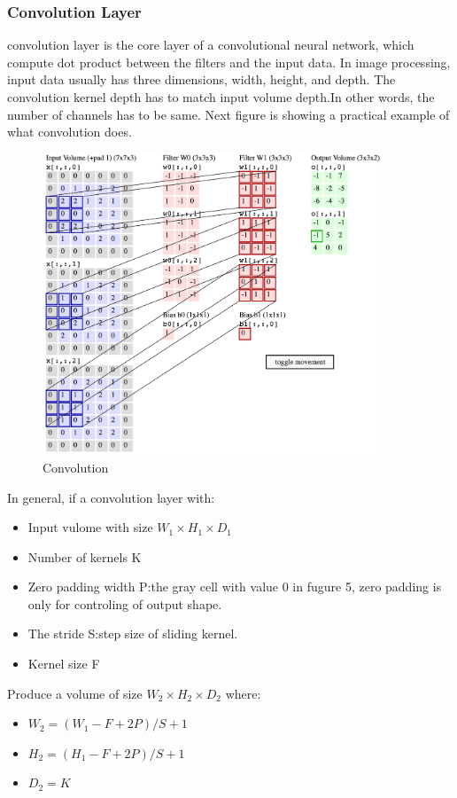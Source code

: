 \documentclass[12pt,a4paper]{report}
\begin{document}
\subsubsection{Convolution Layer \cite{cnn}}
convolution layer is the core layer of a convolutional neural network, which compute dot product between the filters and the input data. In image processing, input data usually has three dimensions, width, height, and depth. The convolution kernel depth has to match input volume depth.In other words, the number of channels has to be same.    Next figure is showing a practical example of what convolution does.	\cite{cnn}
\begin{figure}[h]
\centering
\includegraphics[width=0.9\textwidth]{conv.png}
\caption{Convolution}
\end{figure}

In general, if a convolution layer with:
\begin{itemize}
\item Input vulome with size $W_1\times H_1\times D_1$
\item Number of kernels K
\item Zero padding width P:the gray cell with value 0 in fugure 5, zero padding is only for controling of output shape.
\item The stride S:step size of sliding kernel.
\item Kernel size F
\end{itemize}

Produce a volume of size $W_2 \times H_2 \times D_2$ where:
\begin{itemize}
\item $W_2=(W_1-F+2P)/S+1$
\item $H_2=(H_1-F+2P)/S+1$
\item $D_2=K$
\end{itemize}
\end{document}

